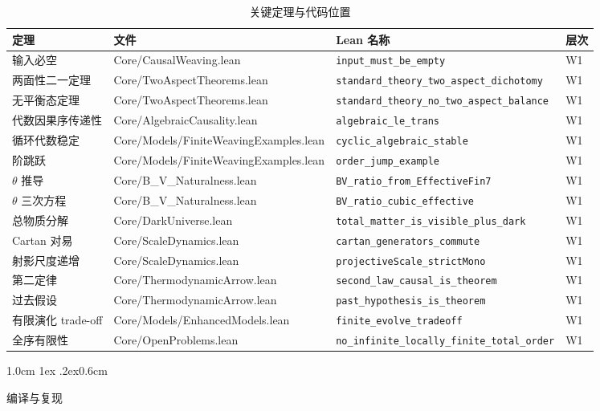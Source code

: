 \documentclass[aps,prd,twocolumn,nofootinbib,floatfix]{revtex4-2}
\makeatletter
\def\section{%
  \@startsection{section}{1}{\z@}
    {1.0cm \@plus1ex \@minus .2ex}{0.6cm}
    {\normalfont\Large\bfseries\raggedright}%
}
\makeatother
\begin{document}
\begin{table}[!t]
\centering
\scriptsize
\begin{tabular}{p{2.2cm}p{5cm}p{6.5cm}p{0.8cm}}
\hline
定理 & 文件 & Lean 名称 & 层次 \\
\hline
输入必空 & Core/CausalWeaving.lean & \texttt{input\_must\_be\_empty} & W1 \\
两面性二一定理 & Core/TwoAspectTheorems.lean & \texttt{standard\_theory\_two\_aspect\_dichotomy} & W1 \\
无平衡态定理 & Core/TwoAspectTheorems.lean & \texttt{standard\_theory\_no\_two\_aspect\_balance} & W1 \\
代数因果序传递性 & Core/AlgebraicCausality.lean & \texttt{algebraic\_le\_trans} & W1 \\
循环代数稳定 & Core/Models/FiniteWeavingExamples.lean & \texttt{cyclic\_algebraic\_stable} & W1 \\
阶跳跃 & Core/Models/FiniteWeavingExamples.lean & \texttt{order\_jump\_example} & W1 \\
$\theta$ 推导 & Core/B\_V\_Naturalness.lean & \texttt{BV\_ratio\_from\_EffectiveFin7} & W1 \\
$\theta$ 三次方程 & Core/B\_V\_Naturalness.lean & \texttt{BV\_ratio\_cubic\_effective} & W1 \\
总物质分解 & Core/DarkUniverse.lean & \texttt{total\_matter\_is\_visible\_plus\_dark} & W1 \\
Cartan 对易 & Core/ScaleDynamics.lean & \texttt{cartan\_generators\_commute} & W1 \\
射影尺度递增 & Core/ScaleDynamics.lean & \texttt{projectiveScale\_strictMono} & W1 \\
第二定律 & Core/ThermodynamicArrow.lean & \texttt{second\_law\_causal\_is\_theorem} & W1 \\
过去假设 & Core/ThermodynamicArrow.lean & \texttt{past\_hypothesis\_is\_theorem} & W1 \\
有限演化 trade-off & Core/Models/EnhancedModels.lean & \texttt{finite\_evolve\_tradeoff} & W1 \\
全序有限性 & Core/OpenProblems.lean & \texttt{no\_infinite\_locally\_finite\_total\_order} & W1 \\
\hline
\end{tabular}
\caption{关键定理与代码位置}
\label{tab:theorems}
\end{table}

\section{编译与复现}
\end{document}
